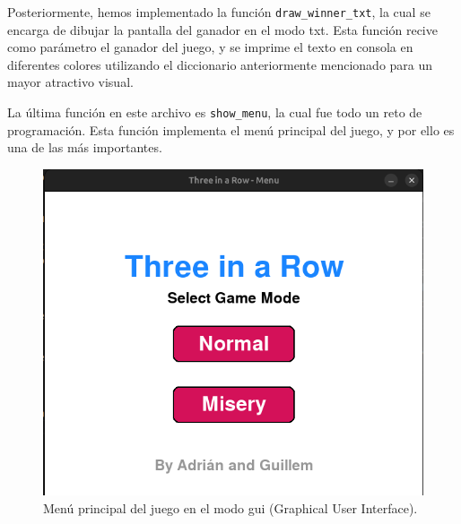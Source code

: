 \documentclass[a4paper,12pt]{article}
\begin{document}
\vspace{\baselineskip}
Posteriormente, hemos implementado la función \texttt{draw\_winner\_txt}, la cual se encarga de dibujar la pantalla del ganador en el modo txt. Esta función recive como parámetro 
el ganador del juego, y se imprime el texto en consola en diferentes colores utilizando el diccionario anteriormente mencionado para un mayor atractivo visual.

\vspace{\baselineskip}
La última función en este archivo es \texttt{show\_menu}, la cual fue todo un reto de programación. Esta función implementa el menú
principal del juego, y por ello es una de las más importantes.
\begin{figure}[htbp]
    \centering
    \includegraphics[scale=0.5]{./imagenes/menu_inicio.png}
    \caption{Menú principal del juego en el modo gui (Graphical User Interface).}\label{fig:men_princ1}
\end{figure}
\end{document}
